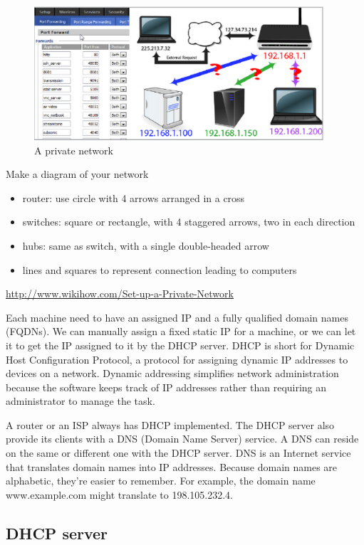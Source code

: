 \begin{figure}[hbt]
  \centerline{\includegraphics[height=5cm,
    angle=0]{./images/private_network.eps}}
  \caption{A private network}
  \label{fig:private_network}
\end{figure}

Make a diagram of your network
\begin{itemize}
  \item router: use circle with 4 arrows arranged in a cross
  \item switches: square or rectangle, with 4 staggered arrows, two in each
  direction
  \item hubs: same as switch, with a single double-headed arrow
  \item lines and squares to represent connection leading to computers
\end{itemize}
\url{http://www.wikihow.com/Set-up-a-Private-Network}

Each machine need to have an assigned IP and a fully qualified domain names
(FQDNs). We can manually assign a fixed static IP for a machine, or we can let
it to get the IP assigned to it by the DHCP server. DHCP is short for Dynamic Host
Configuration Protocol, a protocol for assigning dynamic IP addresses to devices
on a network.  Dynamic addressing simplifies network administration because the
software keeps track of IP addresses rather than requiring an administrator to
manage the task. 

A router or an ISP always has DHCP implemented. The DHCP server also provide its
clients with a DNS (Domain Name Server) service. A DNS can reside on the same or
different one with the DHCP server. DNS is an Internet service that translates
domain names into IP addresses. Because domain names are alphabetic, they're
easier to remember. For example, the domain name www.example.com might translate
to 198.105.232.4. 

\subsection{DHCP server }

